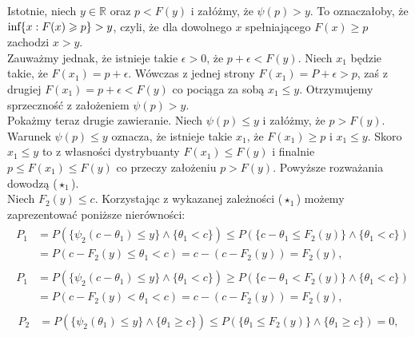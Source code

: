 \documentclass[12pt,a4paper,openany]{book}
\begin{document}
\noindent Istotnie, niech $y \in \mathbb{R}$ oraz $p < F(y)$ i załóżmy, że $\psi(p) > y$. To oznaczałoby, że $\textnormal{inf} \{x: F(x)\geqslant p \} > y$, czyli, że dla dowolnego $x$ spełniającego $F(x) \geqslant p$ zachodzi $x > y$.\\
\noindent Zauważmy jednak, że istnieje takie $\epsilon > 0$, że $p + \epsilon < F(y)$. Niech $x_{1}$ będzie takie, że $F(x_{1}) = p + \epsilon$. Wówczas z jednej strony $F(x_{1}) = P + \epsilon > p$, zaś z drugiej $F(x_{1}) = p + \epsilon < F(y)$ co pociąga za sobą $x_{1} \leqslant y$. Otrzymujemy sprzeczność z założeniem $\psi(p) > y$.\\
\noindent Pokażmy teraz drugie zawieranie. Niech $\psi(p) \leqslant y$ i załóżmy, że $p > F(y)$. Warunek $\psi(p) \leqslant y$ oznacza, że istnieje takie $x_{1}$, że $F(x_{1}) \geqslant p$ i $x_{1} \leqslant y$. Skoro $x_{1} \leqslant y$ to z własności dystrybuanty  $F(x_{1}) \leqslant F(y)$ i finalnie $p \leqslant F(x_{1}) \leqslant F(y)$ co przeczy założeniu $p > F(y)$. Powyższe rozważania dowodzą ($\star_{1}$).\\
\noindent Niech $F_{2}(y) \leqslant c$. Korzystając z wykazanej zależności ($\star_{1}$) możemy zaprezentować poniższe nierówności:
\begin{gather}
\begin{split}
P_{1} &= P(\lbrace \psi_{2}(c-\theta_{1}) \leqslant y \rbrace  \wedge \lbrace \theta_{1} < c \rbrace)  \leqslant P(\lbrace c-\theta_{1} \leqslant F_{2}(y) \rbrace  \wedge \lbrace \theta_{1} < c \rbrace) \\
&= P(c - F_{2}(y) \leqslant \theta_{1} < c) = c - (c - F_{2}(y)) = F_{2}(y), \nonumber
\end{split}
\end{gather}
\begin{gather}
\begin{split}
P_{1} &= P(\lbrace \psi_{2}(c-\theta_{1}) \leqslant y \rbrace  \wedge \lbrace \theta_{1} < c \rbrace)  \geqslant P(\lbrace c-\theta_{1} < F_{2}(y) \rbrace  \wedge \lbrace \theta_{1} < c \rbrace) \\
&= P(c - F_{2}(y) < \theta_{1} < c) = c - (c - F_{2}(y)) = F_{2}(y), \nonumber
\end{split}
\end{gather}
\begin{gather}
\begin{split}
P_{2} &= P(\lbrace \psi_{2}(\theta_{1}) \leqslant y \rbrace  \wedge \lbrace \theta_{1} \geqslant c \rbrace)  \leqslant P(\lbrace \theta_{1} \leqslant F_{2}(y) \rbrace  \wedge \lbrace \theta_{1} \geqslant c \rbrace) = 0, \nonumber
\end{split}
\end{gather}
\end{document}
